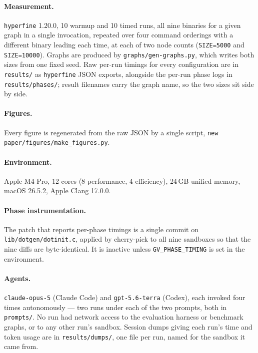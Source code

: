 \paragraph{Measurement.}
\texttt{hyperfine} 1.20.0, 10 warmup and 10 timed runs, all nine binaries for a
given graph in a single invocation, repeated over four command orderings with a
different binary leading each time, at each of two node counts
(\texttt{SIZE=5000} and \texttt{SIZE=10000}). Graphs are produced by
\texttt{graphs/gen-graphs.py}, which writes both sizes from one fixed seed. Raw
per-run timings for every configuration are in \texttt{results/} as
\texttt{hyperfine} JSON exports, alongside the per-run phase logs in
\texttt{results/phases/}; result filenames carry the graph name, so the two
sizes sit side by side.

\paragraph{Figures.}
Every figure is regenerated from the raw JSON by a single script,
\texttt{new paper/figures/make\_figures.py}.

\paragraph{Environment.}
Apple M4 Pro, 12 cores (8 performance, 4 efficiency), 24\,GB unified memory,
macOS 26.5.2, Apple Clang 17.0.0.

\paragraph{Phase instrumentation.}
The patch that reports per-phase timings is a single commit on
\texttt{lib/dotgen/dotinit.c}, applied by cherry-pick to all nine sandboxes so
that the nine diffs are byte-identical. It is inactive unless
\texttt{GV\_PHASE\_TIMING} is set in the environment.

\paragraph{Agents.}
\texttt{claude-opus-5} (Claude Code) and \texttt{gpt-5.6-terra} (Codex), each
invoked four times autonomously --- two runs under each of the two prompts, both
in \texttt{prompts/}. No run had network access to the evaluation harness or
benchmark graphs, or to any other run's sandbox. Session dumps giving each run's
time and token usage are in \texttt{results/dumps/}, one file per run, named for
the sandbox it came from.

